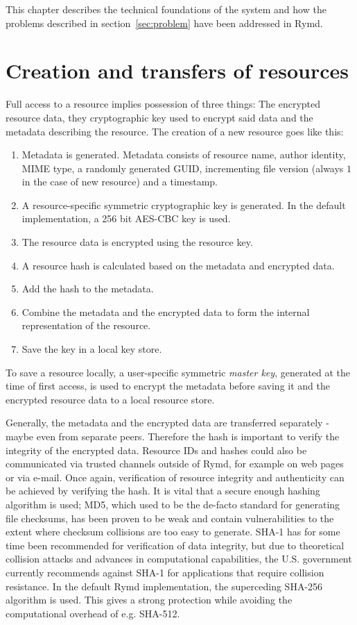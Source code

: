 This chapter describes the technical foundations of the system and how the problems described in section~\ref{sec:problem} have been addressed in Rymd.


\section{Creation and transfers of resources}
Full access to a resource implies possession of three things: The encrypted resource data, they cryptographic key used to encrypt said data and the metadata describing the resource. The creation of a new resource goes like this:
\begin{enumerate}
  \item Metadata is generated. Metadata consists of resource name, author identity, MIME type, a randomly generated GUID, incrementing file version (always $1$ in the case of new resource) and a timestamp.
  \item A resource-specific symmetric cryptographic key is generated. In the default implementation, a 256 bit AES-CBC key is used.
  \item The resource data is encrypted using the resource key.
  \item A resource hash is calculated based on the metadata and encrypted data. 
  \item Add the hash to the metadata.
  \item Combine the metadata and the encrypted data to form the internal representation of the resource.
  \item Save the key in a local key store.
\end{enumerate}

To save a resource locally, a user-specific symmetric \emph{master key}, generated at the time of first access, is used to encrypt the metadata before saving it and the encrypted resource data to a local resource store.

Generally, the metadata and the encrypted data are transferred separately - maybe even from separate peers. Therefore the hash is important to verify the integrity of the encrypted data. Resource IDs and hashes could also be communicated via trusted channels outside of Rymd, for example on web pages or via e-mail. Once again, verification of resource integrity and authenticity can be achieved by verifying the hash. It is vital that a secure enough hashing algorithm is used; MD5, which used to be the de-facto standard for generating file checksums, has been proven to be weak and contain vulnerabilities to the extent where checksum collisions are too easy to generate. SHA-1 has for some time been recommended for verification of data integrity, but due to theoretical collision attacks and advances in computational capabilities, the U.S. government currently recommends against SHA-1 for applications that require collision resistance\cite{NIST:2012}. In the default Rymd implementation, the superceding SHA-256 algorithm is used. This gives a strong protection while avoiding the computational overhead of e.g. SHA-512.

